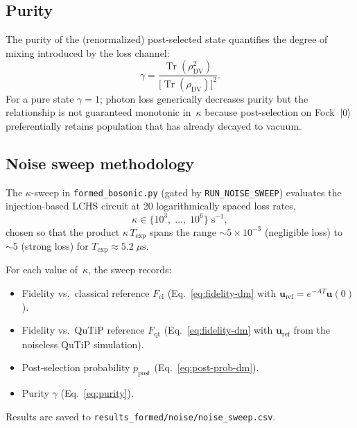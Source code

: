 \documentclass[11pt]{article}
\begin{document}
\subsection{Purity}
The purity of the (renormalized) post-selected state quantifies
the degree of mixing introduced by the loss channel:
\begin{equation}
\gamma
=\frac{\operatorname{Tr}(\rho_{\mathrm{DV}}^2)}
      {\bigl[\operatorname{Tr}(\rho_{\mathrm{DV}})\bigr]^2}.
\label{eq:purity}
\end{equation}
For a pure state $\gamma=1$; photon loss generically decreases purity
but the relationship is not guaranteed monotonic in~$\kappa$ because
post-selection on Fock~$\ket{0}$ preferentially retains population that
has already decayed to vacuum.

\subsection{Noise sweep methodology}
The $\kappa$-sweep in \texttt{formed\_bosonic.py} (gated by
\texttt{RUN\_NOISE\_SWEEP}) evaluates the injection-based LCHS circuit
at 20 logarithmically spaced loss rates,
\begin{equation}
\kappa\in\bigl\{10^3,\;\dots,\;10^6\bigr\}\;\text{s}^{-1},
\label{eq:kappa-range}
\end{equation}
chosen so that the product $\kappa\,T_{\mathrm{exp}}$ spans the
range $\sim\!5\times 10^{-3}$ (negligible loss) to $\sim\!5$
(strong loss) for $T_{\mathrm{exp}}\approx 5.2\;\mu\text{s}$.

For each value of~$\kappa$, the sweep records:
\begin{itemize}
\item Fidelity vs.\ classical reference
  $F_{\mathrm{cl}}$ (Eq.~\ref{eq:fidelity-dm} with
  $\bm{u}_{\mathrm{ref}}=e^{-AT}\bm{u}(0)$).
\item Fidelity vs.\ QuTiP reference
  $F_{\mathrm{qt}}$ (Eq.~\ref{eq:fidelity-dm} with $\bm{u}_{\mathrm{ref}}$ from the
  noiseless QuTiP simulation).
\item Post-selection probability $p_{\mathrm{post}}$
  (Eq.~\ref{eq:post-prob-dm}).
\item Purity $\gamma$ (Eq.~\ref{eq:purity}).
\end{itemize}
Results are saved to \texttt{results\_formed/noise/noise\_sweep.csv}.
\end{document}
